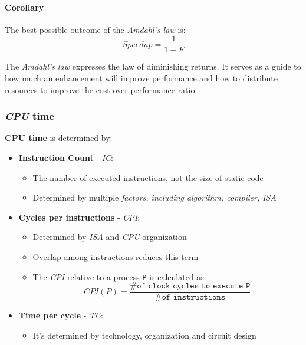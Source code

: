 \documentclass[english]{article}
\begin{document}
\paragraph{Corollary}

The best possible outcome of the \textit{Amdahl's law} is:
\[ Speedup = \dfrac{1}{1 - F} \]


The \textit{Amdahl's law} expresses the law of diminishing returns.
It serves as a guide to how much an enhancement will improve performance and how to distribute resources to improve the cost-over-performance ratio.

\subsubsection{\textit{CPU} time}

\textbf{CPU time} is determined by:

\begin{itemize}
  \item \textbf{Instruction Count} - \textit{IC}:
        \begin{itemize}
          \item The number of executed instructions, not the size of static code
          \item Determined by multiple \textit{factors, including algorithm, compiler, ISA}
        \end{itemize}
  \item \textbf{Cycles per instructions} - \textit{CPI}:
        \begin{itemize}
          \item Determined by \textit{ISA} and \textit{CPU} organization
          \item Overlap among instructions reduces this term
          \item The \textit{CPI} relative to a process \texttt{P} is calculated as:
                \[ CPI(P) = \dfrac{\texttt{\# of clock cycles to execute P}}{\texttt{\# of instructions}} \]
        \end{itemize}
  \item \textbf{Time per cycle} - \textit{TC}:
        \begin{itemize}
          \item It's determined by technology, organization and circuit design
        \end{itemize}
\end{itemize}
\end{document}
